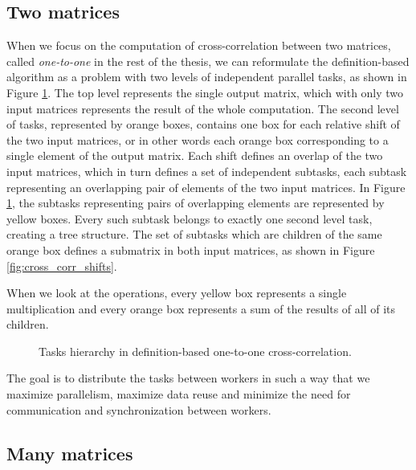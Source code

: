 \subsection{Two matrices}
When we focus on the computation of cross-correlation between two matrices, called \textit{one-to-one} in the rest of the thesis, we can reformulate the definition-based algorithm as a problem with two levels of independent parallel tasks, as shown in Figure \ref{fig:cross_corr_one_to_one_tasks}. The top level represents the single output matrix, which with only two input matrices represents the result of the whole computation. The second level of tasks, represented by orange boxes, contains one box for each relative shift of the two input matrices, or in other words each orange box corresponding to a single element of the output matrix. Each shift defines an overlap of the two input matrices, which in turn defines a set of independent subtasks, each subtask representing an overlapping pair of elements of the two input matrices. In Figure \ref{fig:cross_corr_one_to_one_tasks}, the subtasks representing pairs of overlapping elements are represented by yellow boxes. Every such subtask belongs to exactly one second level task, creating a tree structure. The set of subtasks which are children of the same orange box defines a submatrix in both input matrices, as shown in Figure \ref{fig:cross_corr_shifts}.


When we look at the operations, every yellow box represents a single multiplication and every orange box represents a sum of the results of all of its children. 

\begin{figure}[ht]
	\fontsize{5}{6}\selectfont
	\centering
	\def\svgwidth{0.6\textwidth}
	
	\caption{Tasks hierarchy in definition-based one-to-one cross-correlation.}
	\label{fig:cross_corr_one_to_one_tasks}
\end{figure}

The goal is to distribute the tasks between workers in such a way that we maximize parallelism, maximize data reuse and minimize the need for communication and synchronization between workers.

\subsection{Many matrices}

